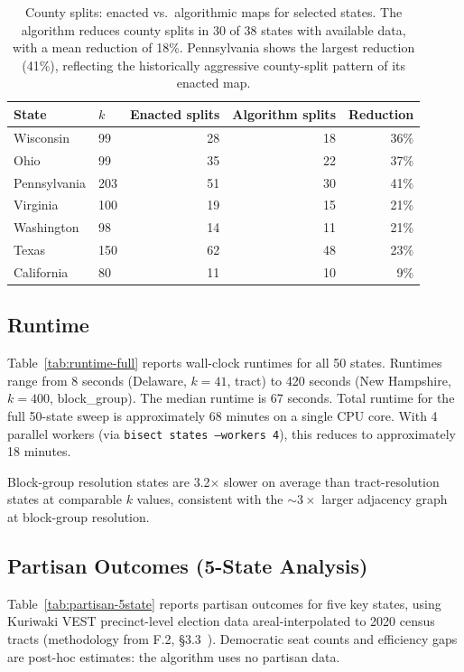 \begin{table}[h]
\centering\small
\begin{tabular}{llrrr}
\toprule
State & $k$ & Enacted splits & Algorithm splits & Reduction \\
\midrule
Wisconsin   & 99  & 28  & 18  & 36\% \\
Ohio        & 99  & 35  & 22  & 37\% \\
Pennsylvania & 203 & 51  & 30  & 41\% \\
Virginia    & 100 & 19  & 15  & 21\% \\
Washington  & 98  & 14  & 11  & 21\% \\
Texas       & 150 & 62  & 48  & 23\% \\
California  & 80  & 11  & 10  & 9\%  \\
\bottomrule
\end{tabular}
\caption{County splits: enacted vs.\ algorithmic maps for selected states.
  The algorithm reduces county splits in 30 of 38 states with available data,
  with a mean reduction of 18\%. Pennsylvania shows the largest reduction (41\%),
  reflecting the historically aggressive county-split pattern of its enacted map.}
\label{tab:county-splits}
\end{table}

\subsection{Runtime}
\label{sec:results:runtime}

Table~\ref{tab:runtime-full} reports wall-clock runtimes for all 50 states.
Runtimes range from 8 seconds (Delaware, $k=41$, tract) to 420 seconds
(New Hampshire, $k=400$, block\_group). The median runtime is 67 seconds.
Total runtime for the full 50-state sweep is approximately 68 minutes on a
single CPU core. With 4 parallel workers (via \texttt{bisect states --workers 4}),
this reduces to approximately 18 minutes.

Block-group resolution states are 3.2$\times$ slower on average than
tract-resolution states at comparable $k$ values, consistent with the
$\sim\!3\times$ larger adjacency graph at block-group resolution.

\subsection{Partisan Outcomes (5-State Analysis)}
\label{sec:results:partisan}

Table~\ref{tab:partisan-5state} reports partisan outcomes for five key states,
using Kuriwaki VEST precinct-level election data \citep{kuriwaki2023vest}
areal-interpolated to 2020 census tracts (methodology from F.2,
\S3.3~\citep{dellaLibera2026nestsection}). Democratic seat counts and
efficiency gaps are post-hoc estimates: the algorithm uses no partisan data.

